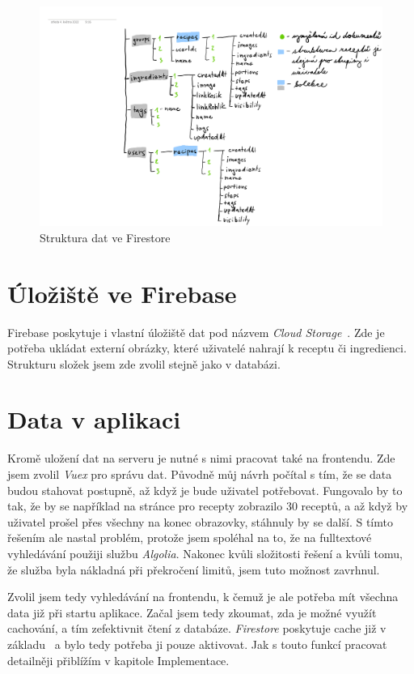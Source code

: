 \begin{figure}[H]
    \includegraphics[width=\textwidth]{pdf/navrh-firestore}
    \caption{Struktura dat ve Firestore} \label{picture:recipeo:firestore-structure}
\end{figure}

\section{Úložiště ve Firebase}
Firebase poskytuje i vlastní úložiště dat pod názvem \emph{Cloud Storage}~\cite{CloudStorage}. Zde je potřeba ukládat externí obrázky, které uživatelé
nahrají k receptu či ingredienci. Strukturu složek jsem zde zvolil stejně jako v databázi.

\section{Data v aplikaci}
Kromě uložení dat na serveru je nutné s nimi pracovat také na frontendu. Zde jsem zvolil \emph{Vuex} pro správu dat. Původně
můj návrh počítal s tím, že se data budou stahovat postupně, až když je bude uživatel potřebovat. Fungovalo by to tak, že by
se například na stránce pro recepty zobrazilo 30 receptů, a až když by uživatel prošel přes všechny na konec obrazovky, stáhnuly
by se další. S tímto řešením ale nastal problém, protože jsem spoléhal na to, že na fulltextové vyhledávání použiji službu
\emph{Algolia}. Nakonec kvůli složitosti řešení a kvůli tomu, že služba byla nákladná při překročení limitů, jsem tuto možnost zavrhnul.

Zvolil jsem tedy vyhledávání na frontendu, k čemuž je ale potřeba mít všechna data již při startu aplikace. Začal jsem tedy
zkoumat, zda je možné využít cachování, a tím zefektivnit čtení z databáze. \emph{Firestore} poskytuje cache již v základu~\cite{FirestoreCache} a bylo
tedy potřeba ji pouze aktivovat. Jak s touto funkcí pracovat detailněji přiblížím v kapitole Implementace.

